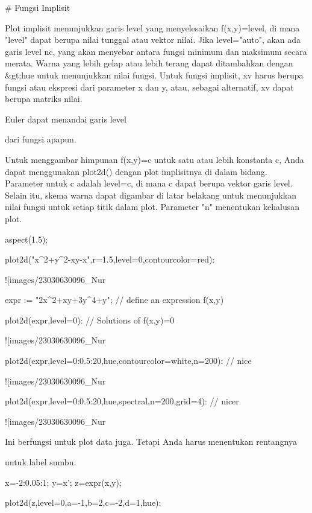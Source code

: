 \documentclass{article}
\begin{document}
# Fungsi Implisit

Plot implisit menunjukkan garis level yang menyelesaikan f(x,y)=level,
di mana "level" dapat berupa nilai tunggal atau vektor nilai. Jika
level="auto", akan ada garis level nc, yang akan menyebar antara
fungsi minimum dan maksimum secara merata. Warna yang lebih gelap atau
lebih terang dapat ditambahkan dengan &gt;hue untuk menunjukkan nilai
fungsi. Untuk fungsi implisit, xv harus berupa fungsi atau ekspresi
dari parameter x dan y, atau, sebagai alternatif, xv dapat berupa
matriks nilai.


Euler dapat menandai garis level


dari fungsi apapun.


Untuk menggambar himpunan f(x,y)=c untuk satu atau lebih konstanta c,
Anda dapat menggunakan plot2d() dengan plot implisitnya di dalam
bidang. Parameter untuk c adalah level=c, di mana c dapat berupa
vektor garis level. Selain itu, skema warna dapat digambar di latar
belakang untuk menunjukkan nilai fungsi untuk setiap titik dalam plot.
Parameter "n" menentukan kehalusan plot.


\>aspect(1.5); 

\>plot2d("x^2+y^2-x\*y-x",r=1.5,level=0,contourcolor=red):


![images/23030630096_Nur%

\>expr := "2\*x^2+x\*y+3\*y^4+y"; // define an expression f(x,y)

\>plot2d(expr,level=0): // Solutions of f(x,y)=0


![images/23030630096_Nur%

\>plot2d(expr,level=0:0.5:20,\>hue,contourcolor=white,n=200): // nice


![images/23030630096_Nur%

\>plot2d(expr,level=0:0.5:20,\>hue,\>spectral,n=200,grid=4): // nicer


![images/23030630096_Nur%

Ini berfungsi untuk plot data juga. Tetapi Anda harus menentukan
rentangnya


untuk label sumbu.


\>x=-2:0.05:1; y=x'; z=expr(x,y);

\>plot2d(z,level=0,a=-1,b=2,c=-2,d=1,\>hue):
\end{document}
